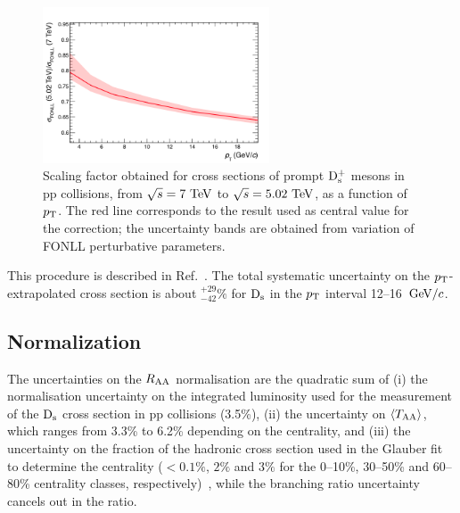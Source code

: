 \begin{figure}[!h]
\centering
 \includegraphics[width=0.6\textwidth]{FigCap5/FONLLscaling7To5TeV.png}
 \caption{Scaling factor obtained for cross sections of prompt ${\rm D_s^+}$ mesons in pp collisions, from $\sqrt{s}=7~\mathrm{TeV}$ to $\sqrt{s}=5.02~\mathrm{TeV}$, as a function of $p_{\rm T}$. The red line corresponds to the result used as central value for the correction; the uncertainty bands are obtained from variation of FONLL perturbative parameters. }
 \label{fig:FONLLscalFact}
\end{figure}

This procedure is described in Ref.~\cite{Adam:2015sza}. The total 
systematic uncertainty on the $p_{\rm T}$-extrapolated cross section is about 
$^{+29}_{-42}\%$ for ${\rm D_s}$ in the $p_{\rm T}$ interval 12--16~$\mathrm{GeV}/c$.


\subsection{Normalization}
\label{sec:NormalizSyst}
The uncertainties on the $R_{\rm AA}$ normalisation are the quadratic sum of 
(i) the normalisation uncertainty on the integrated luminosity used for the measurement of the ${\rm D_s}$ cross section in pp collisions (3.5\%), 
(ii) the uncertainty on $\langle T_{\rm AA} \rangle$, which ranges from 3.3\% to 6.2\% depending on the centrality, and
(iii) the uncertainty on the fraction of the hadronic cross section used in the 
Glauber fit to determine the centrality ($<0.1\%$, $2\%$ and $3\%$ for the 0--10\%, 30--50\% 
and 60--80\% centrality classes, respectively)~\cite{Adam:2015sza}, while the branching ratio uncertainty cancels out in the 
ratio.

